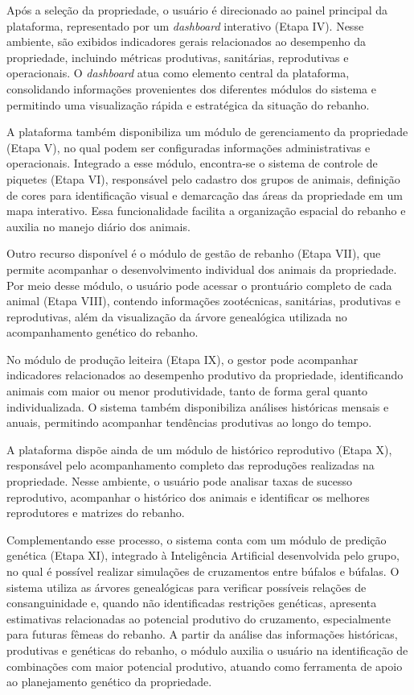\documentclass[11pt,a4paper]{article}
\begin{document}
Após a seleção da propriedade, o usuário é direcionado ao painel principal da plataforma, representado por um \textit{dashboard} interativo (Etapa IV). Nesse ambiente, são exibidos indicadores gerais relacionados ao desempenho da propriedade, incluindo métricas produtivas, sanitárias, reprodutivas e operacionais. O \textit{dashboard} atua como elemento central da plataforma, consolidando informações provenientes dos diferentes módulos do sistema e permitindo uma visualização rápida e estratégica da situação do rebanho.

A plataforma também disponibiliza um módulo de gerenciamento da propriedade (Etapa V), no qual podem ser configuradas informações administrativas e operacionais. Integrado a esse módulo, encontra-se o sistema de controle de piquetes (Etapa VI), responsável pelo cadastro dos grupos de animais, definição de cores para identificação visual e demarcação das áreas da propriedade em um mapa interativo. Essa funcionalidade facilita a organização espacial do rebanho e auxilia no manejo diário dos animais.

Outro recurso disponível é o módulo de gestão de rebanho (Etapa VII), que permite acompanhar o desenvolvimento individual dos animais da propriedade. Por meio desse módulo, o usuário pode acessar o prontuário completo de cada animal (Etapa VIII), contendo informações zootécnicas, sanitárias, produtivas e reprodutivas, além da visualização da árvore genealógica utilizada no acompanhamento genético do rebanho.

No módulo de produção leiteira (Etapa IX), o gestor pode acompanhar indicadores relacionados ao desempenho produtivo da propriedade, identificando animais com maior ou menor produtividade, tanto de forma geral quanto individualizada. O sistema também disponibiliza análises históricas mensais e anuais, permitindo acompanhar tendências produtivas ao longo do tempo.

A plataforma dispõe ainda de um módulo de histórico reprodutivo (Etapa X), responsável pelo acompanhamento completo das reproduções realizadas na propriedade. Nesse ambiente, o usuário pode analisar taxas de sucesso reprodutivo, acompanhar o histórico dos animais e identificar os melhores reprodutores e matrizes do rebanho.

Complementando esse processo, o sistema conta com um módulo de predição genética (Etapa XI), integrado à Inteligência Artificial desenvolvida pelo grupo, no qual é possível realizar simulações de cruzamentos entre búfalos e búfalas. O sistema utiliza as árvores genealógicas para verificar possíveis relações de consanguinidade e, quando não identificadas restrições genéticas, apresenta estimativas relacionadas ao potencial produtivo do cruzamento, especialmente para futuras fêmeas do rebanho. A partir da análise das informações históricas, produtivas e genéticas do rebanho, o módulo auxilia o usuário na identificação de combinações com maior potencial produtivo, atuando como ferramenta de apoio ao planejamento genético da propriedade.
\end{document}
